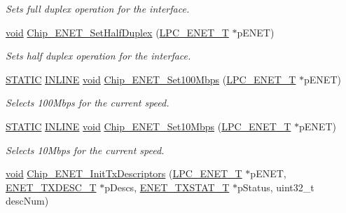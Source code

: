 \begin{DoxyCompactItemize}
\begin{DoxyCompactList}\small\item\em Sets full duplex operation for the interface. \end{DoxyCompactList}\item 
\hyperlink{Paradigm_2Tern__EE_2small_2portmacro_8h_a14d32f8130d3c0b212cfc751730b5b49}{void} \hyperlink{group__ENET__17XX__40XX_ga6d7031584471e30e89ded1fff5f3340d}{Chip\-\_\-\-E\-N\-E\-T\-\_\-\-Set\-Half\-Duplex} (\hyperlink{structLPC__ENET__T}{L\-P\-C\-\_\-\-E\-N\-E\-T\-\_\-\-T} $\ast$p\-E\-N\-E\-T)
\begin{DoxyCompactList}\small\item\em Sets half duplex operation for the interface. \end{DoxyCompactList}\item 
\hyperlink{group__LPC__Types__Public__Macros_ga10b2d890d871e1489bb02b7e70d9bdfb}{S\-T\-A\-T\-I\-C} \hyperlink{group__LPC__Types__Public__Types_ga2eb6f9e0395b47b8d5e3eeae4fe0c116}{I\-N\-L\-I\-N\-E} \hyperlink{Paradigm_2Tern__EE_2small_2portmacro_8h_a14d32f8130d3c0b212cfc751730b5b49}{void} \hyperlink{group__ENET__17XX__40XX_gad78db17fecab956142cb20d9a00e39e0}{Chip\-\_\-\-E\-N\-E\-T\-\_\-\-Set100\-Mbps} (\hyperlink{structLPC__ENET__T}{L\-P\-C\-\_\-\-E\-N\-E\-T\-\_\-\-T} $\ast$p\-E\-N\-E\-T)
\begin{DoxyCompactList}\small\item\em Selects 100\-Mbps for the current speed. \end{DoxyCompactList}\item 
\hyperlink{group__LPC__Types__Public__Macros_ga10b2d890d871e1489bb02b7e70d9bdfb}{S\-T\-A\-T\-I\-C} \hyperlink{group__LPC__Types__Public__Types_ga2eb6f9e0395b47b8d5e3eeae4fe0c116}{I\-N\-L\-I\-N\-E} \hyperlink{Paradigm_2Tern__EE_2small_2portmacro_8h_a14d32f8130d3c0b212cfc751730b5b49}{void} \hyperlink{group__ENET__17XX__40XX_ga996dae6b7276fc708594ce239f40785f}{Chip\-\_\-\-E\-N\-E\-T\-\_\-\-Set10\-Mbps} (\hyperlink{structLPC__ENET__T}{L\-P\-C\-\_\-\-E\-N\-E\-T\-\_\-\-T} $\ast$p\-E\-N\-E\-T)
\begin{DoxyCompactList}\small\item\em Selects 10\-Mbps for the current speed. \end{DoxyCompactList}\item 
\hyperlink{Paradigm_2Tern__EE_2small_2portmacro_8h_a14d32f8130d3c0b212cfc751730b5b49}{void} \hyperlink{group__ENET__17XX__40XX_ga1e57967b888b1a7bfd4313fd9e70c696}{Chip\-\_\-\-E\-N\-E\-T\-\_\-\-Init\-Tx\-Descriptors} (\hyperlink{structLPC__ENET__T}{L\-P\-C\-\_\-\-E\-N\-E\-T\-\_\-\-T} $\ast$p\-E\-N\-E\-T, \hyperlink{structENET__TXDESC__T}{E\-N\-E\-T\-\_\-\-T\-X\-D\-E\-S\-C\-\_\-\-T} $\ast$p\-Descs, \hyperlink{structENET__TXSTAT__T}{E\-N\-E\-T\-\_\-\-T\-X\-S\-T\-A\-T\-\_\-\-T} $\ast$p\-Status, uint32\-\_\-t desc\-Num)

\end{DoxyCompactItemize}

